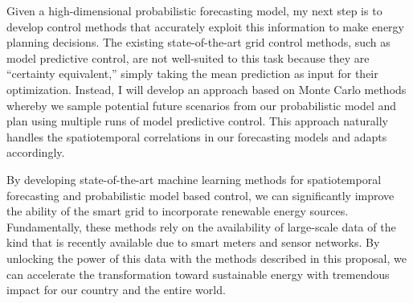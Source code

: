 \documentclass[12pt]{article}
\begin{document}
Given a high-dimensional probabilistic forecasting model, my next step is to develop control methods that accurately exploit this information to make energy planning decisions. The existing state-of-the-art grid control methods, such as model predictive control, are not well-suited to this task because they are ``certainty equivalent,'' simply taking the mean prediction as input for their optimization. Instead, I will develop an approach based on Monte Carlo methods whereby we sample potential future scenarios from our probabilistic model and plan using multiple runs of model predictive control. This approach naturally handles the spatiotemporal correlations in our forecasting models and adapts accordingly.

By developing state-of-the-art machine learning methods for spatiotemporal forecasting and probabilistic model based control, we can significantly improve the ability of the smart grid to incorporate renewable energy sources. Fundamentally, these methods rely on the availability of large-scale data of the kind that is recently available due to smart meters and sensor networks. By unlocking the power of this data with the methods described in this proposal, we can accelerate the transformation toward sustainable energy with tremendous impact for our country and the entire world.

\renewcommand{\refname}{\vskip -1.5cm}
\footnotesize


\end{document}
